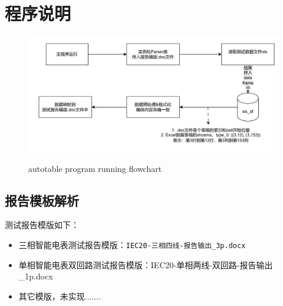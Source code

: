 
\section{程序说明}

\begin{figure}[H]
    \begin{center}
        \includegraphics[width=.95\linewidth]{res/autotable.jpg}\\
        \caption{autotable program running flowchart}\label{autotable}
    \end{center}
\end{figure}

\subsection{报告模板解析}
测试报告模版如下：
\vspace{-.7cm}
    \begin{itemize}
        \item 三相智能电表测试报告模版：\texttt{IEC20-三相四线-报告输出\_3p.docx}  %
        \item 单相智能电表双回路测试报告模版：IEC20-单相两线-双回路-报告输出\_1p.docx %
        \item 其它模版，未实现.......
    \end{itemize}

